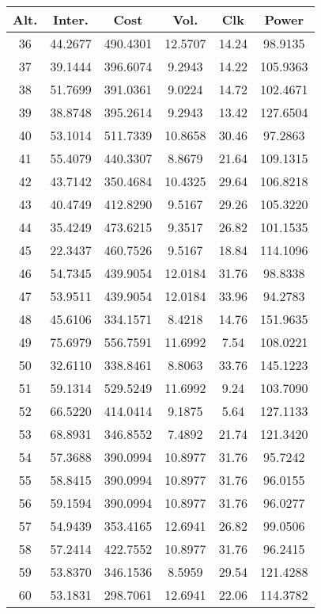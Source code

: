 \begin{center}
\begin{footnotesize}
\begin{tabular}{|c|ccccc|}
\hline
Alt. & Inter. & Cost & Vol. & Clk & Power\\
\hline
36 & 44.2677 & 490.4301 & 12.5707 & 14.24 & 98.9135 \\
37 & 39.1444 & 396.6074 & 9.2943 & 14.22 & 105.9363 \\
38 & 51.7699 & 391.0361 & 9.0224 & 14.72 & 102.4671 \\
39 & 38.8748 & 395.2614 & 9.2943 & 13.42 & 127.6504 \\
40 & 53.1014 & 511.7339 & 10.8658 & 30.46 & 97.2863 \\
41 & 55.4079 & 440.3307 & 8.8679 & 21.64 & 109.1315 \\
42 & 43.7142 & 350.4684 & 10.4325 & 29.64 & 106.8218 \\
43 & 40.4749 & 412.8290 & 9.5167 & 29.26 & 105.3220 \\
44 & 35.4249 & 473.6215 & 9.3517 & 26.82 & 101.1535 \\
45 & 22.3437 & 460.7526 & 9.5167 & 18.84 & 114.1096 \\
46 & 54.7345 & 439.9054 & 12.0184 & 31.76 & 98.8338 \\
47 & 53.9511 & 439.9054 & 12.0184 & 33.96 & 94.2783 \\
48 & 45.6106 & 334.1571 & 8.4218 & 14.76 & 151.9635 \\
49 & 75.6979 & 556.7591 & 11.6992 & 7.54 & 108.0221 \\
50 & 32.6110 & 338.8461 & 8.8063 & 33.76 & 145.1223 \\
51 & 59.1314 & 529.5249 & 11.6992 & 9.24 & 103.7090 \\
52 & 66.5220 & 414.0414 & 9.1875 & 5.64 & 127.1133 \\
53 & 68.8931 & 346.8552 & 7.4892 & 21.74 & 121.3420 \\
54 & 57.3688 & 390.0994 & 10.8977 & 31.76 & 95.7242 \\
55 & 58.8415 & 390.0994 & 10.8977 & 31.76 & 96.0155 \\
56 & 59.1594 & 390.0994 & 10.8977 & 31.76 & 96.0277 \\
57 & 54.9439 & 353.4165 & 12.6941 & 26.82 & 99.0506 \\
58 & 57.2414 & 422.7552 & 10.8977 & 31.76 & 96.2415 \\
59 & 53.8370 & 346.1536 & 8.5959 & 29.54 & 121.4288 \\
60 & 53.1831 & 298.7061 & 12.6941 & 22.06 & 114.3782 \\

\end{tabular}
\end{footnotesize}
\end{center}
